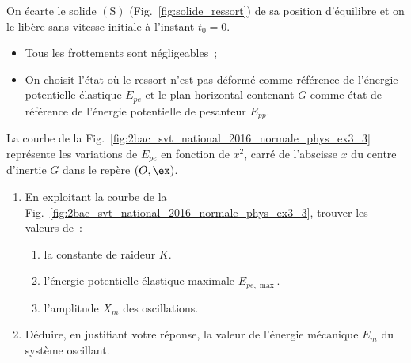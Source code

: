 On écarte le solide $\mathrm{(S)}$ (Fig.~\ref{fig:solide_ressort}) de sa
position d'équilibre et on le libère sans vitesse initiale à l'instant
$t_{0}=0$.

\begin{minipage}{0.70\linewidth}
    \begin{donnees}
        \begin{itemize}
          \item Tous les frottements sont négligeables~;
          \item On choisit l'état où le ressort n'est pas déformé comme
                référence de l'énergie potentielle élastique $E_{pe}$ et le plan
                horizontal contenant $G$ comme état de référence de l'énergie
                potentielle de pesanteur $E_{pp}$.
        \end{itemize}
    \end{donnees}

    La courbe de la Fig.~\ref{fig:2bac_svt_national_2016_normale_phys_ex3_3}
    représente les variations de $E_{pe}$ en fonction de $x^{2}$, carré de
    l'abscisse $x$ du centre d'inertie $G$ dans le repère $(O,\ex)$.
    \begin{enumerate}
        \item En exploitant la courbe de la
              Fig.~\ref{fig:2bac_svt_national_2016_normale_phys_ex3_3},
              trouver les valeurs de~:
              \begin{enumerate}
                  \item la constante de raideur $K$.
                  \item l'énergie potentielle élastique maximale $E_{pe,\max}$.
                  \item l'amplitude $X_{m}$ des oscillations.
              \end{enumerate}
        \item Déduire, en justifiant votre réponse, la valeur de l'énergie
              mécanique $E_{m}$ du système oscillant.
    \end{enumerate}
\end{minipage}
\hfill
